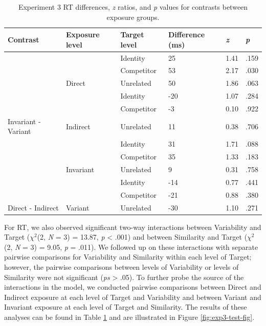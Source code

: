 \documentclass[
  12pt,
  twoside]{article}
\begin{document}
\begin{table}

\caption{\label{tab:exp3-test2-tab}Experiment 3 RT differences, \textit{z} ratios, and \textit{p} values for contrasts between exposure groups.}
\centering
\begin{tabular}[t]{l|l|l|l|l|l}
\hline
Contrast & Exposure level & Target level & Difference (ms) & \textit{z} & \textit{p}\\
\hline
 &  & Identity & 25 & 1.41 & .159\\
\cline{3-6}
 &  & Competitor & 53 & 2.17 & .030\\
\cline{3-6}
 & \multirow{-3}{*}{\raggedright\arraybackslash Direct} & Unrelated & 50 & 1.86 & .063\\
\cline{2-6}
 &  & Identity & -20 & 1.07 & .284\\
\cline{3-6}
 &  & Competitor & -3 & 0.10 & .922\\
\cline{3-6}
\multirow{-6}{*}{\raggedright\arraybackslash Invariant - Variant} & \multirow{-3}{*}{\raggedright\arraybackslash Indirect} & Unrelated & 11 & 0.38 & .706\\
\cline{1-6}
 &  & Identity & 31 & 1.71 & .088\\
\cline{3-6}
 &  & Competitor & 35 & 1.33 & .183\\
\cline{3-6}
 & \multirow{-3}{*}{\raggedright\arraybackslash Invariant} & Unrelated & 9 & 0.31 & .758\\
\cline{2-6}
 &  & Identity & -14 & 0.77 & .441\\
\cline{3-6}
 &  & Competitor & -21 & 0.88 & .380\\
\cline{3-6}
\multirow{-6}{*}{\raggedright\arraybackslash Direct - Indirect} & \multirow{-3}{*}{\raggedright\arraybackslash Variant} & Unrelated & -30 & 1.10 & .271\\
\hline
\end{tabular}
\end{table}

For RT, we also observed significant two-way interactions between Variability and Target (\(\chi^2\)(2, \emph{N} = 3) = 13.87, \emph{p} \textless{} .001) and between Similarity and Target (\(\chi^2\)(2, \emph{N} = 3) = 9.05, \emph{p} = .011).
We followed up on these interactions with separate pairwise comparisons for Variability and Similarity within each level of Target; however, the pairwise comparisons between levels of Variability or levels of Similarity were not significant (\emph{ps} \textgreater{} .05).
To further probe the source of the interactions in the model, we conducted pairwise comparisons between Direct and Indirect exposure at each level of Target and Variability and between Variant and Invariant exposure at each level of Target and Similarity.
The results of these analyses can be found in Table \ref{tab:exp3-test2-tab} and are illustrated in Figure \ref{fig:exp3-test-fig}.
\end{document}

